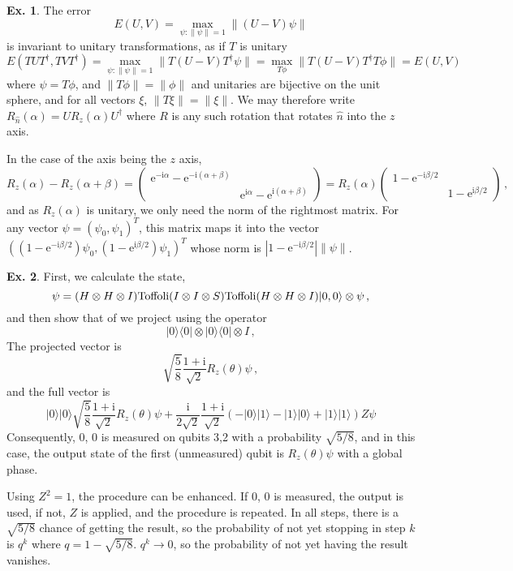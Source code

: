 \documentclass[a4paper,12pt]{article}
\def\e{\mathrm{e}}
\def\imagi{\mathrm{i}}
\theoremstyle{definition}
\newtheorem{exercise}{Ex.}[section]
\begin{document}
\begin{exercise}
 The error
 \[
  E(U,V) = \max_{\psi:\|\psi\|=1}\|(U-V)\psi\|
 \]
 is invariant to unitary transformations, as if $T$ is unitary
 \[
  E(TUT^\dagger, TVT^\dagger) = \max_{\psi:\|\psi\|=1} \| T(U-V)T^\dagger \psi\| = \max_{T\phi}\|T(U-V)T^\dagger T\phi \| = E(U,V)\,
 \]
 where $\psi=T\phi$, and $\|T\phi\| = \|\phi\|$ and unitaries are bijective on the unit sphere, and for all vectors $\xi$, $\|T\xi\|=\|\xi\|$. We may therefore write $R_{\hat n}(\alpha) = UR_z(\alpha)U^\dagger$ where $R$ is any such rotation that rotates $\hat n$ into the $z$ axis.

 In the case of the axis being the $z$ axis,
 \[
  R_z(\alpha) - R_z(\alpha+\beta) =
  \begin{pmatrix}
   \e^{-\imagi\alpha} - \e^{-\imagi(\alpha+\beta)} & \\
   & \e^{\imagi\alpha} - \e^{\imagi(\alpha+\beta)}
  \end{pmatrix}
  =
  R_z(\alpha)
  \begin{pmatrix}
   1 - \e^{-\imagi\beta/2} & \\
   & 1 - \e^{\imagi\beta/2}
  \end{pmatrix}\,,
 \]
 and as $R_z(\alpha)$ is unitary, we only need the norm of the rightmost matrix. For any vector $\psi=(\psi_0,\psi_1)^T$, this matrix maps it into the vector $((1-\e^{-\imagi\beta/2})\psi_0, (1-\e^{\imagi\beta/2})\psi_1)^T$ whose norm is $|1-\e^{-\imagi\beta/2}|\|\psi\|$.
\end{exercise}

\begin{exercise}
 First, we calculate the state,
 \[
  \psi = (H\otimes H \otimes I){\rm Toffoli}(I\otimes I \otimes S){\rm Toffoli}(H\otimes H\otimes I)|0,0\rangle\otimes \psi\,,
 \]
 and then show that of we project using the operator
 \[
  |0\rangle\langle 0|\otimes |0\rangle\langle 0|\otimes I\,,
 \]
 The projected vector is
 \[
  \sqrt{\frac{5}{8}} \frac{1+\imagi}{\sqrt{2}}R_z(\theta) \psi\,,
 \]
 and the full vector is
 \[
  |0\rangle|0\rangle \sqrt{\frac{5}{8}} \frac{1+\imagi}{\sqrt{2}}R_z(\theta) \psi + \frac{\imagi}{2\sqrt{2}}\frac{1+\imagi}{\sqrt{2}} (-|0\rangle|1\rangle - |1\rangle|0\rangle + |1\rangle|1\rangle)Z \psi
 \]
 Consequently,  0, 0 is measured on qubits 3,2 with a probability $\sqrt{5/8}$, and in this case, the output state of the first (unmeasured) qubit is $R_z(\theta)\psi$ with a global phase.

 Using $Z^2=1$, the procedure can be enhanced. If 0, 0 is measured, the output is used, if not, $Z$ is applied, and the procedure is repeated. In all steps, there is a $\sqrt{5/8}$ chance of getting the result, so the probability of not yet stopping in step $k$ is $q^k$ where $q=1-\sqrt{5/8}$. $q^k\to 0$, so the probability of not yet having the result vanishes.
\end{exercise}
\end{document}
